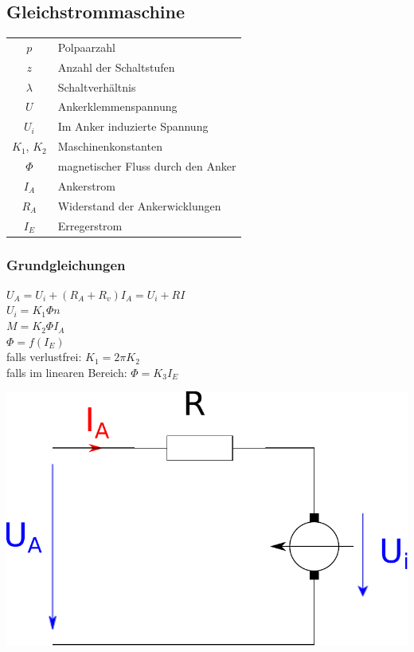 \documentclass[european]{latex4ei_sheet}
\begin{document}
		\subsection{Gleichstrommaschine}
		
		\begin{tabular}{cl}
		$p$ & Polpaarzahl \\
		$z$ & Anzahl der Schaltstufen \\
		$\lambda$ & Schaltverhältnis \\
		$U$ & Ankerklemmenspannung \\
		$U_i$ & Im Anker induzierte Spannung \\
		$K_1$, $K_2$ & Maschinenkonstanten \\
		$\Phi$ & magnetischer Fluss durch den Anker \\
		$I_A$ & Ankerstrom \\
		$R_A$ & Widerstand der Ankerwicklungen \\
		$I_E$ & Erregerstrom
		\end{tabular}
		
		\subsubsection{Grundgleichungen}
		$U_A = U_i + (R_A + R_v) I_A = U_i + RI$\\
		$U_i = K_1 \Phi n$\\
		$M = K_2 \Phi I_A$\\
		$\Phi = f(I_E)$\\
		falls verlustfrei: $K_1 = 2 \pi K_2$ \\
		falls im linearen Bereich: $\Phi = K_3 I_E$ \\
		
		\begin{center}
		\includegraphics[scale=.2]{./img/ersatzschaltbild_gleichstrommaschine.pdf}
		\end{center}
		
\end{document}
